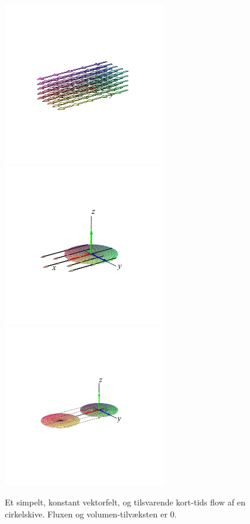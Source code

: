 \begin{figure}[ht]
\centerline{\includegraphics[width=70mm]{FIGS/plotSkiveFlowB1}\includegraphics[width=70mm]{FIGS/plotSkiveFlowB3}\includegraphics[width=70mm]{FIGS/plotSkiveFlowB2}}
\begin{center}
\caption{\small{Et simpelt, konstant vektorfelt, og tilsvarende kort-tids flow af en cirkelskive. Fluxen og volumen-tilvæksten er $0$. }} \label{figSkiveFlowB}
\end{center}
\end{figure}




